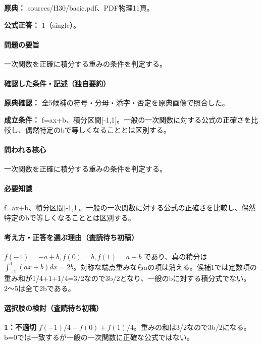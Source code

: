 \noindent\textbf{原典：} sources/H30/basic.pdf、PDF物理11頁。

\textbf{公式正答：} 1（single）。

\paragraph{問題の要旨} 一次関数を正確に積分する重みの条件を判定する。

\paragraph{確認した条件・記述（独自要約）}\mbox{}\par

\noindent\textbf{原典確認：} 全5候補の符号・分母・添字・否定を原典画像で照合した。\par

\noindent\textbf{成立条件：} f=\allowbreak{}ax+b、積分区間[-1,1]。一般の一次関数に対する公式の正確さを比較し、偶然特定のbで等しくなることとは区別する。\par

\paragraph{問われる核心} 一次関数を正確に積分する重みの条件を判定する。

\paragraph{必要知識} f=\allowbreak{}ax+b、積分区間[-1,1]。一般の一次関数に対する公式の正確さを比較し、偶然特定のbで等しくなることとは区別する。

\paragraph{考え方・正答を選ぶ理由（査読待ち初稿）} \(f(-1)=-a+b,f(0)=b,f(1)=a+b\) であり、真の積分は \(\int_{-1}^1(ax+b)dx=2b\)。対称な端点重みならaの項は消える。候補1では定数項の重み和が1/4+1+1/4=\allowbreak{}3/2なので3b/2となり、一般のbに対する積分式でない。2〜5は全て2bである。

\paragraph{選択肢の検討（査読待ち初稿）}\mbox{}\par

\noindent\textbf{1：不適切} \(f(-1)/4+f(0)+f(1)/4\)。重みの和は3/2なので3b/2になる。b=\allowbreak{}0では一致するが一般の一次関数に正確な公式ではない。\par

